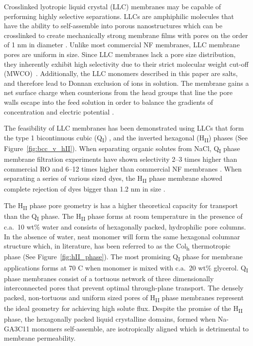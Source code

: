 \documentclass[journal=jpcbfk,manusciprt=article]{achemso}
\begin{document}
  Crosslinked lyotropic liquid crystal (LLC) membranes may be capable of
  performing highly selective separations. LLCs are amphiphilic molecules that
  have the ability to self-assemble into porous nanostructures
  \cite{smith_ordered_1997} which can be crosslinked to create mechanically
  strong membrane films with pores on the order of 1 nm in diameter
  \cite{zhou_supported_2005}. Unlike most commercial NF membranes, LLC membrane pores
  are uniform in size. Since LLC membranes lack a pore size distribution, they
  inherently exhibit high selectivity due to their strict molecular weight
  cut-off (MWCO)~\cite{zhou_supported_2005}. Additionally, the LLC monomers
  described in this paper are salts, and therefore lead to Donnan exclusion of ions
  in solution. The membrane gains a net surface charge when counterions from the head
  groups that line the pore walls escape into the feed solution in order to balance 
  the gradients of concentration and electric potential \cite{donnan_theory_1995}.    

  The feasibility of LLC membranes has been demonstrated using LLCs that form
  the type 1 bicontinuous cubic (Q\textsubscript{I})
  \cite{hatakeyama_water_2011,hatakeyama_nanoporous_2010,carter_glycerol-based_2012},
  and the inverted hexagonal (H\textsubscript{II}) \cite{zhou_supported_2005}
  phases (See Figure~\ref{fig:bcc_v_hII}). When separating organic solutes from
  NaCl, Q\textsubscript{I} phase membrane filtration experiments have shown
  selectivity 2--3 times higher than commercial RO and 6--12 times higher than
  commercial NF membranes \cite{dischinger_application_2017}.  When separating a
  series of various sized dyes, the H\textsubscript{II} phase membrane showed
  complete rejection of dyes bigger than 1.2 nm in size \cite{zhou_supported_2005}. 

  The H\textsubscript{II} phase pore geometry is has a higher theoretical capacity
  for transport than the Q\textsubscript{I} phase. The H\textsubscript{II} phase forms
  at room temperature in the presence of c.a.~10 wt\% water and consists of hexagonally
  packed, hydrophilic pore columns\cite{smith_ordered_1997}. In the absence of
  water, neat monomer will form the same hexagonal columnar structure which, in
  literature, has been referred to as the Col\textsubscript{h} thermotropic
  phase\cite{feng_scalable_2014} (See Figure~\ref{fig:hII_phase}). The most
  promising Q\textsubscript{I} phase for membrane applications forms at 70\degree
  C when monomer is mixed with c.a.~20 wt\% glycerol\cite{carter_glycerol-based_2012}.
  Q\textsubscript{I} phase membranes consist of a tortuous network of three dimensionally 
  interconnected pores that prevent optimal through-plane transport. The densely packed, 
  non-tortuous and uniform sized pores of H\textsubscript{II} phase membranes represent
  the ideal geometry for achieving high solute flux\cite{matyka_tortuosity-porosity_2008}.
  Despite the promise of the H\textsubscript{II} phase, the hexagonally packed
  liquid crystalline domains, formed when Na-GA3C11 monomers self-assemble, are
  isotropically aligned which is detrimental to membrane permeability. 
\end{document}
